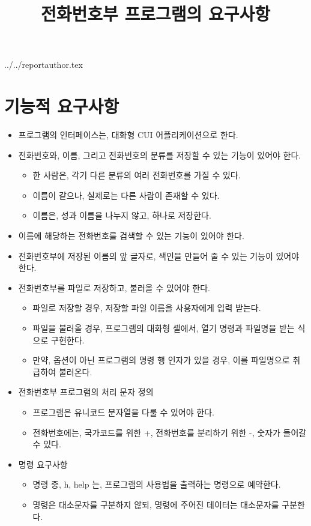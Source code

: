 \documentclass {article}
\begin{document}
\title {전화번호부 프로그램의 요구사항}
 {../../reportauthor.tex}
\maketitle

\clearpage
\section{기능적 요구사항}
\begin{itemize}
\item 프로그램의 인터페이스는, 대화형 CUI 어플리케이션으로 한다.
\item 전화번호와, 이름, 그리고 전화번호의 분류를 저장할 수 있는 기능이 있어야 한다.
  \begin{itemize}
  \item 한 사람은, 각기 다른 분류의 여러 전화번호를 가질 수 있다.
  \item 이름이 같으나, 실제로는 다른 사람이 존재할 수 있다.
  \item 이름은, 성과 이름을 나누지 않고, 하나로 저장한다.
  \end{itemize}
\item 이름에 해당하는 전화번호를 검색할 수 있는 기능이 있어야 한다.
\item 전화번호부에 저장된 이름의 앞 글자로, 색인을 만들어 줄 수 있는 기능이 있어야 한다.
\item 전화번호부를 파일로 저장하고, 불러올 수 있어야 한다.
  \begin {itemize}
  \item 파일로 저장할 경우, 저장할 파일 이름을 사용자에게 입력 받는다.
  \item 파일을 불러올 경우, 프로그램의 대화형 셸에서, 열기 명령과 파일명을 받는 식으로 구현한다.
  \item 만약, 옵션이 아닌 프로그램의 명령 행 인자가 있을 경우, 이를 파일명으로 취급하여 불러온다.
  \end {itemize}
\item 전화번호부 프로그램의 처리 문자 정의
  \begin {itemize}
  \item 프로그램은 유니코드 문자열을 다룰 수 있어야 한다.
  \item 전화번호에는, 국가코드를 위한 +, 전화번호를 분리하기 위한 -, 숫자가 들어갈 수 있다.
  \end{itemize}
\item 명령 요구사항
  \begin{itemize}
  \item 명령 중, h, help 는, 프로그램의 사용법을 출력하는 명령으로 예약한다.
  \item 명령은 대소문자를 구분하지 않되, 명령에 주어진 데이터는 대소문자를 구분한다.
  \end{itemize}
\end{itemize}
\end{document}
